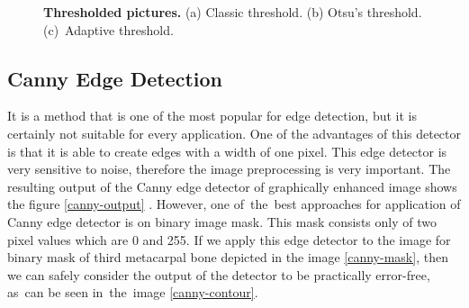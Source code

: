 \begin{figure}[ht]
\begin{subfigure}[b]{.3\linewidth}
        \caption{}\label{adaptive-thresh}
    \end{subfigure}
    \caption{\textbf{Thresholded pictures.} (a) Classic threshold. (b) Otsu's threshold. (c)~Adaptive threshold.}
    \label{thresholds}
\end{figure}

\subsection{Canny Edge Detection}
It is a method that is one of the most popular for edge detection, but it is certainly not suitable for every application. One of the advantages of this detector is that it is able to create edges with a width of one pixel. This edge detector is very sensitive to noise, therefore the image preprocessing is very important. The resulting output of the Canny edge detector of graphically enhanced image shows the figure \ref{canny-output} \cite{canny-edge-detector}. However, one of~the~best approaches for application of Canny edge detector is on binary image mask. This mask consists only of two pixel values which are 0 and 255. If we apply this edge detector to the image for binary mask of third metacarpal bone depicted in the image \ref{canny-mask}, then we can safely consider the output of the detector to be practically error-free, as~can be seen in~the~image \ref{canny-contour}. 

